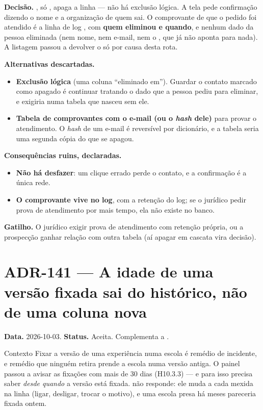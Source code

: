 \textbf{Decisão.} , só ,
apaga a linha --- não há exclusão lógica. A tela pede confirmação dizendo o
nome e a organização de quem sai. O comprovante de que o pedido foi atendido é a
linha de log , com \textbf{quem eliminou e
quando}, e nenhum dado da pessoa eliminada (nem nome, nem e-mail, nem o
, que já não aponta para nada). A listagem passou a devolver o 
só por causa desta rota.

\textbf{Alternativas descartadas.}

\begin{itemize}
  \item \textbf{Exclusão lógica} (uma coluna \enquote{eliminado em}). Guardar o
    contato marcado como apagado é continuar tratando o dado que a pessoa pediu
    para eliminar, e exigiria  numa tabela que nasceu sem ele.
  \item \textbf{Tabela de comprovantes com o e-mail (ou o \emph{hash} dele)}
    para provar o atendimento. O \emph{hash} de um e-mail é reversível por
    dicionário, e a tabela seria uma segunda cópia do que se apagou.
\end{itemize}

\textbf{Consequências ruins, declaradas.}

\begin{itemize}
  \item \textbf{Não há desfazer}: um clique errado perde o contato, e a
    confirmação é a única rede.
  \item \textbf{O comprovante vive no log}, com a retenção do log; se o
    jurídico pedir prova de atendimento por mais tempo, ela não existe no banco.
\end{itemize}

\textbf{Gatilho.} O jurídico exigir prova de atendimento com retenção própria,
ou a prospecção ganhar relação com outra tabela (aí apagar em cascata vira
decisão).

\section{ADR-141 --- A idade de uma versão fixada sai do histórico, não de uma coluna nova}
\label{adr:fixacao-antiga}

\textbf{Data.} 2026-10-03. \textbf{Status.} Aceita. Complementa a
.

\begin{especificacao}{Contexto}
Fixar a versão de uma experiência numa escola é remédio de incidente, e remédio
que ninguém retira prende a escola numa versão antiga. O painel passou a avisar
as fixações com mais de 30 dias (H10.3.3) --- e para isso precisa saber
\emph{desde quando} a versão está fixada. 
não responde: ele muda a cada mexida na linha (ligar, desligar, trocar o
motivo), e uma escola presa há meses pareceria fixada ontem.
\end{especificacao}

